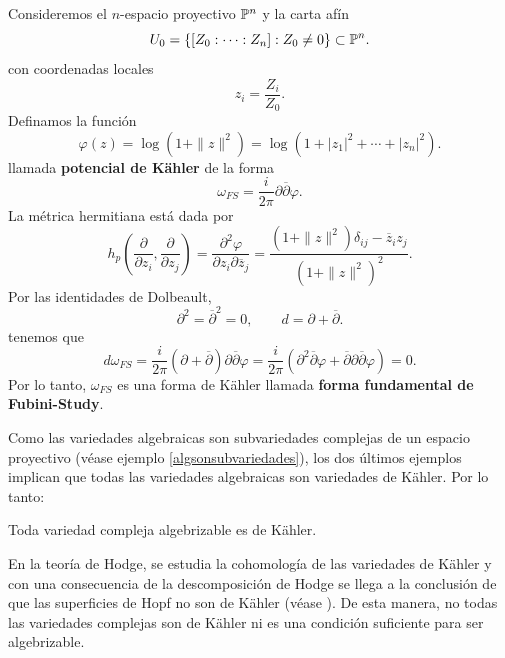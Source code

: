 \begin{example}
	Consideremos el $n$-espacio proyectivo $\mathbb{P}^n$ y la carta afín
	\begin{equation*}
		U_0=\{[Z_0:\cdots:Z_n]:Z_0\neq 0\}\subset\mathbb{P}^n.
	\end{equation*}
	con coordenadas locales
	\begin{equation*}
		z_i=\frac{Z_i}{Z_0}.
	\end{equation*} 
	Definamos la función
	\begin{equation*}
		\varphi(z)=\log(1+\|z\|^2)=\log(1+|z_1|^2+\cdots+|z_n|^2).
	\end{equation*}
	llamada \textbf{potencial de Kähler} de la forma 
	\begin{equation*}
		\omega_{FS}=\frac{i}{2\pi}\partial \overline{\partial}\varphi.
	\end{equation*}
	La métrica hermitiana está dada por
	\begin{equation*}
		h_p\left(\frac{\partial}{\partial z_i},\frac{\partial}{\partial z_j}\right)=\frac{\partial^2 \varphi}{\partial z_i\partial \overline{z}_j}=\frac{(1+\|z\|^2)\delta_{ij}-\overline{z}_i z_j}{(1+\|z\|^2)^2}.
	\end{equation*}
	Por las identidades de Dolbeault,
	\begin{equation*}
		\partial^2=\overline{\partial}^2=0,\qquad d=\partial+\overline{\partial}.
	\end{equation*}
	tenemos que
	\begin{equation*}
		d\omega_{FS}=\frac{i}{2\pi}(\partial+\overline{\partial})\partial \overline{\partial}\varphi=\frac{i}{2\pi}(\partial^2\overline{\partial}\varphi+\overline{\partial}\partial\overline{\partial}\varphi)=0.
	\end{equation*}
	Por lo tanto, $\omega_{FS}$ es una forma de Kähler llamada \textbf{forma fundamental de Fubini-Study}.
\end{example}

Como las variedades algebraicas son subvariedades complejas de un espacio proyectivo (véase ejemplo \ref{algsonsubvariedades}), los dos últimos ejemplos implican que todas las variedades algebraicas son variedades de Kähler. Por lo tanto:

\begin{corollary}
	Toda variedad compleja algebrizable es de Kähler.
\end{corollary}

En la teoría de Hodge, se estudia la cohomología de las variedades de Kähler y con una consecuencia de la descomposición de Hodge se llega a la conclusión de que las superficies de Hopf no son de Kähler (véase  \parencite[Corollary 6.13]{2002hodge}). De esta manera, no todas las variedades complejas son de Kähler ni es una condición suficiente para ser algebrizable. 

